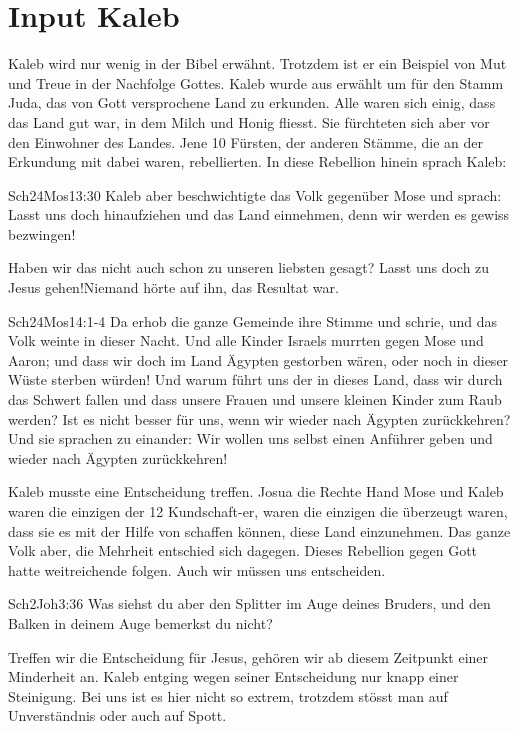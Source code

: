 \documentclass[12pt,a4paper]{scrarticle}
\begin{document}
\section{Input Kaleb}
Kaleb wird nur wenig in der Bibel erwähnt. Trotzdem ist er ein Beispiel von Mut und Treue in der Nachfolge Gottes. Kaleb wurde aus erwählt um für den Stamm Juda, das von Gott versprochene Land zu erkunden. Alle waren sich einig, dass das Land gut war, in dem Milch und Honig fliesst. Sie fürchteten sich aber vor den Einwohner des Landes. Jene 10 Fürsten, der anderen Stämme, die an der Erkundung mit dabei waren, rebellierten. In diese Rebellion hinein sprach Kaleb:
\begin{bibeltext}{Sch2}{4Mos}{13:30}
Kaleb aber beschwichtigte das Volk gegenüber Mose und sprach: \glqq{}Lasst uns doch hinaufziehen und das Land einnehmen, denn wir werden es gewiss bezwingen!\grqq
\end{bibeltext}
Haben wir das nicht auch schon zu unseren liebsten gesagt? \glqq{}Lasst uns doch zu Jesus gehen!\grqq Niemand hörte auf ihn, das Resultat war. 
\begin{bibeltext}{Sch2}{4Mos}{14:1-4}
Da erhob die ganze Gemeinde ihre Stimme und schrie, und das Volk weinte in dieser Nacht. Und alle Kinder Israels murrten gegen Mose und Aaron; und dass wir doch im Land Ägypten gestorben wären, oder noch in dieser Wüste sterben würden! Und warum führt uns der \herr{} in dieses Land, dass wir durch das Schwert fallen und dass unsere Frauen und unsere kleinen Kinder zum Raub werden? Ist es nicht besser für uns, wenn wir wieder nach Ägypten zurückkehren? Und sie sprachen zu einander: \glqq{}Wir wollen uns selbst einen Anführer geben und wieder nach Ägypten zurückkehren!\grqq
\end{bibeltext}
Kaleb musste eine Entscheidung treffen. Josua die Rechte Hand Mose und Kaleb waren die einzigen der 12 Kundschaft-er, waren die einzigen die überzeugt waren, dass sie es mit der Hilfe von schaffen können, diese Land einzunehmen. Das ganze Volk aber, die Mehrheit entschied sich dagegen. Dieses Rebellion gegen Gott hatte weitreichende folgen.
Auch wir müssen uns entscheiden. 
\begin{bibeltext}{Sch2}{Joh}{3:36}
    Was siehst du aber den Splitter im Auge deines Bruders, und den Balken in deinem
Auge bemerkst du nicht?
\end{bibeltext}
Treffen wir die Entscheidung für Jesus, gehören wir ab diesem Zeitpunkt einer Minderheit an. Kaleb entging wegen seiner Entscheidung nur knapp einer Steinigung. Bei uns ist es hier nicht so extrem, trotzdem stösst man auf Unverständnis oder auch auf Spott.
\end{document}
